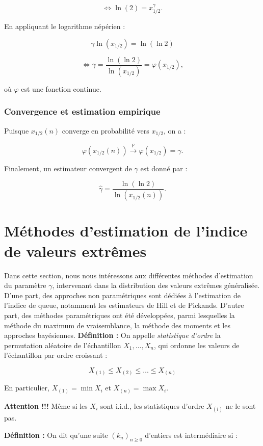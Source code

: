 \documentclass{article}
\begin{document}
\[
\iff \ln(2) = x_{1/2}^{\gamma}.
\]

En appliquant le logarithme népérien :

\[
\gamma \ln(x_{1/2}) = \ln(\ln 2)
\]

\[
\iff \gamma = \frac{\ln(\ln 2)}{\ln(x_{1/2})} = \varphi(x_{1/2}),
\]

où \(\varphi\) est une fonction continue.

\subsubsection{Convergence et estimation empirique}

Puisque \(x_{1/2}(n)\) converge en probabilité vers \(x_{1/2}\), on a :

\[
\varphi(x_{1/2}(n)) \xrightarrow{\mathbb{P}} \varphi(x_{1/2}) = \gamma.
\]

Finalement, un estimateur convergent de \(\gamma\) est donné par :

\[
\hat{\gamma} = \frac{\ln(\ln 2)}{\ln(x_{1/2}(n))}.
\]

\section{Méthodes d'estimation de l'indice de valeurs extrêmes}
Dans cette section, nous nous intéressons aux différentes méthodes d'estimation du paramètre \(\gamma\), intervenant dans la distribution des valeurs extrêmes généralisée. D'une part, des approches non paramétriques sont dédiées à l'estimation de l'indice de queue, notamment les estimateurs de Hill et de Pickands. D'autre part, des méthodes paramétriques ont été développées, parmi lesquelles la méthode du maximum de vraisemblance, la méthode des moments et les approches bayésiennes.
\newline
\textbf{Définition :} On appelle \textit{statistique d'ordre} la permutation aléatoire de l'échantillon \(X_1, \dots, X_n\), qui ordonne les valeurs de l’échantillon par ordre croissant :

\[
X_{(1)} \leq X_{(2)} \leq \dots \leq X_{(n)}
\]

En particulier, \(X_{(1)} = \min X_i\) et \(X_{(n)} = \max X_i\).

\textbf{Attention !!!} Même si les \(X_i\) sont i.i.d., les statistiques d’ordre \(X_{(i)}\) ne le sont pas.

\textbf{Définition :} On dit qu'une suite \((k_n)_{n \geq 0}\) d'entiers est intermédiaire si :
\end{document}
